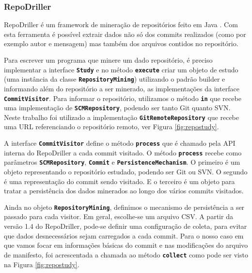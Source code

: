 \documentclass[a4paper,12pt]{article}
\begin{document}

\subsubsection{RepoDriller}%
\label{sec:repodriller}
RepoDriller é um framework de mineração de repositórios feito em Java  \cite{repodriller}. Com esta ferramenta é possível extrair dados não só dos commits realizados (como por exemplo autor e mensagem) mas também dos arquivos contidos no repositório.

Para escrever um programa que minere um dado repositório, é preciso implementar a interface {\small\texttt{\textbf{Study}}} e no método {\small\texttt{\textbf{execute}}} criar um objeto de estudo (uma instância da classe {\small\texttt{\textbf{RepositoryMining}}}) utilizando o padrão builder e informando além do repositório a ser minerado, as implementações da interface {\small\texttt{\textbf{CommitVisitor}}}.  Para informar o repositório, utilizamos o método {\small\texttt{\textbf{in}}} que recebe uma implementação de  {\small\texttt{\textbf{SCMRepository}}}, podendo ser tanto Git quanto SVN. Neste trabalho foi utilizado a implementação {\small\texttt{\textbf{GitRemoteRepository}}} que recebe uma URL referenciando o repositório remoto, ver Figura \ref{fig:repostudy}.

A interface {\small\texttt{\textbf{CommitVisitor}}} define o método {\small\texttt{\textbf{process}}} que é chamado pela API interna do RepoDriller a cada commit visitado. O método {\small\texttt{\textbf{process}}} recebe como parâmetros {\small\texttt{\textbf{SCMRepository}}}, {\small\texttt{\textbf{Commit}}} e {\small\texttt{\textbf{PersistenceMechanism}}}. O primeiro é um objeto representando o repositório estudado, podendo ser Git ou SVN. O segundo é uma representação do commit sendo visitado. E o terceiro é um objeto para tratar a persistência dos dados minerados ao longo dos vários commits visitados.

Ainda no objeto {\small\texttt{\textbf{RepositoryMining}}}, definimos o mecanismo de persistência a ser passado para cada visitor. Em geral, escolhe-se um arquivo CSV. A partir da versão 1.4 do RepoDriller, pode-se definir uma configuração de coleta, para evitar que dados desnecessários sejam carregados a cada commit. Para o nosso caso em que vamos focar em informações básicas do commit e nas modificações do arquivo de manifesto, foi acrescentada a chamada ao método  {\small\texttt{\textbf{collect}}} como pode ser visto na Figura \ref{fig:repostudy}.
\end{document}
